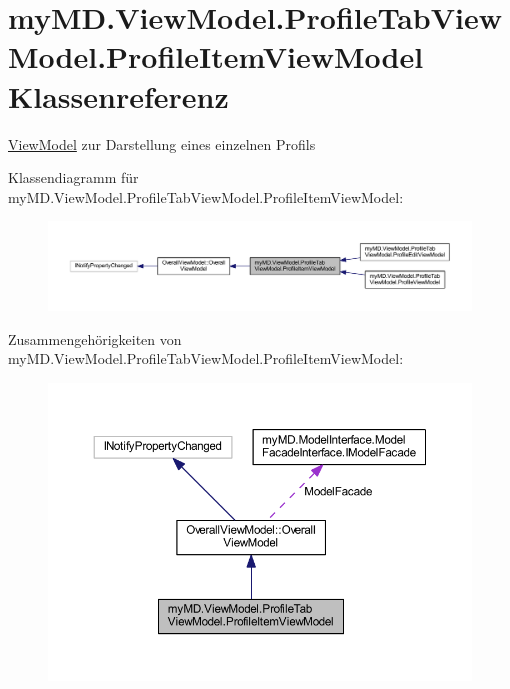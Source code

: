 \hypertarget{classmy_m_d_1_1_view_model_1_1_profile_tab_view_model_1_1_profile_item_view_model}{}\section{my\+M\+D.\+View\+Model.\+Profile\+Tab\+View\+Model.\+Profile\+Item\+View\+Model Klassenreferenz}
\label{classmy_m_d_1_1_view_model_1_1_profile_tab_view_model_1_1_profile_item_view_model}


\mbox{\hyperlink{namespacemy_m_d_1_1_view_model}{View\+Model}} zur Darstellung eines einzelnen Profils  




Klassendiagramm für my\+M\+D.\+View\+Model.\+Profile\+Tab\+View\+Model.\+Profile\+Item\+View\+Model\+:
\nopagebreak
\begin{figure}[H]
\begin{center}
\leavevmode
\includegraphics[width=350pt]{classmy_m_d_1_1_view_model_1_1_profile_tab_view_model_1_1_profile_item_view_model__inherit__graph}
\end{center}
\end{figure}


Zusammengehörigkeiten von my\+M\+D.\+View\+Model.\+Profile\+Tab\+View\+Model.\+Profile\+Item\+View\+Model\+:
\nopagebreak
\begin{figure}[H]
\begin{center}
\leavevmode
\includegraphics[width=350pt]{classmy_m_d_1_1_view_model_1_1_profile_tab_view_model_1_1_profile_item_view_model__coll__graph}
\end{center}
\end{figure}

